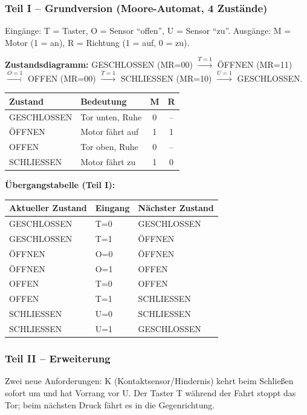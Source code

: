\documentclass[11pt,a4paper]{article}
\begin{document}
\subsubsection{Teil I -- Grundversion (Moore-Automat, 4 Zustände)}
Eingänge: T = Taster, O = Sensor ``offen'', U = Sensor ``zu''. Ausgänge: M = Motor (1 = an), R = Richtung (1 = auf, 0 = zu).

\textbf{Zustandsdiagramm:}
GESCHLOSSEN (MR=00) $\xrightarrow{T=1}$ ÖFFNEN (MR=11) $\xrightarrow{O=1}$ OFFEN (MR=00) $\xrightarrow{T=1}$ SCHLIESSEN (MR=10) $\xrightarrow{U=1}$ GESCHLOSSEN.

\begin{center}
\begin{tabular}{llcc}
    \toprule
    Zustand & Bedeutung & M & R \\ \midrule
    GESCHLOSSEN & Tor unten, Ruhe & 0 & -- \\
    ÖFFNEN & Motor fährt auf & 1 & 1 \\
    OFFEN & Tor oben, Ruhe & 0 & -- \\
    SCHLIESSEN & Motor fährt zu & 1 & 0 \\ \bottomrule
\end{tabular}
\end{center}

\textbf{Übergangstabelle (Teil I):}
\begin{center}
\begin{tabular}{lll}
    \toprule
    Aktueller Zustand & Eingang & Nächster Zustand \\ \midrule
    GESCHLOSSEN & T=0 & GESCHLOSSEN \\
    GESCHLOSSEN & T=1 & ÖFFNEN \\
    ÖFFNEN & O=0 & ÖFFNEN \\
    ÖFFNEN & O=1 & OFFEN \\
    OFFEN & T=0 & OFFEN \\
    OFFEN & T=1 & SCHLIESSEN \\
    SCHLIESSEN & U=0 & SCHLIESSEN \\
    SCHLIESSEN & U=1 & GESCHLOSSEN \\ \bottomrule
\end{tabular}
\end{center}

\subsubsection{Teil II -- Erweiterung}
Zwei neue Anforderungen: K (Kontaktsensor/Hindernis) kehrt beim Schließen sofort um und hat Vorrang vor U. Der Taster T während der Fahrt stoppt das Tor; beim nächsten Druck fährt es in die Gegenrichtung.
\end{document}

